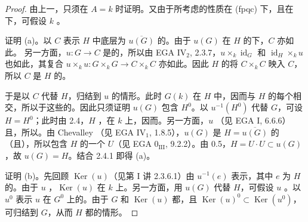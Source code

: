 \begin{proof}
由上一，只须在 $A=k$ 时证明。又由于所考虑的性质在 (fpqc) 下，且在下，可假设 $k$ 。

证明 (a)。以 $C$ 表示 $H$ 中底层为 $\overline{u(G)}$ 的。由于 $u(G)$ 在 $H$ 的下，$C$ 亦如此。
另一方面，$u:G\to C$ 是的，所以由 EGA IV$_2$, 2.3.7，$u\times_k\operatorname{id}_G$ 和 $\operatorname{id}_H\times_k u$ 也如此，其复合 $u\times_k u:G\times_k G\to C\times_k C$ 亦如此。因此 $H$ 的将 $C\times_k C$ 映入 $C$，所以 $C$ 是 $H$ 的。

于是以 $C$ 代替 $H$，归结到 $u$ 的情形。此时 $G(k)$ 在 $H$ 中，因而与 $H$ 的每个相交，所以于这些的。因此只须证明 $u(G)$ 包含 $H^0$。以 $u^{-1}(H^0)$ 代替 $G$，可设 $H=H^0$；此时由 2.4，$H$ ，在 $k$ 上，因而。另一方面，$u$ （见 EGA I, 6.6.6）且，所以。由 Chevalley （见 EGA IV$_1$, 1.8.5），$u(G)$ 是 $H=\overline{u(G)}$ 的（且），所以包含 $H$ 的一个 $U$（见 EGA $0_{\mathrm{III}}$, 9.2.2）。由 0.5，$H=U\cdot U\subset u(G)$，故 $u(G)=H$。结合 2.4.1 即得 (a)。

证明 (b)。先回顾 $\operatorname{Ker}(u)$（见第 I 讲 2.3.6.1）由 $u^{-1}(e)$ 表示，其中 $e$ 为 $H$ 的。由于 $u$ ，$\operatorname{Ker}(u)$ 在 $k$ 上。另一方面，用 $u(G)$ 代替 $H$，可假设 $u$ 。以 $u^0$ 表示 $u$ 在 $G^0$ 上的。由于 $G$ 和 $\operatorname{Ker}(u)$ 都，且 $\operatorname{Ker}(u)^0\subset\operatorname{Ker}(u^0)$，可归结到 $G$，从而 $H$ 都的情形。


\end{proof}
